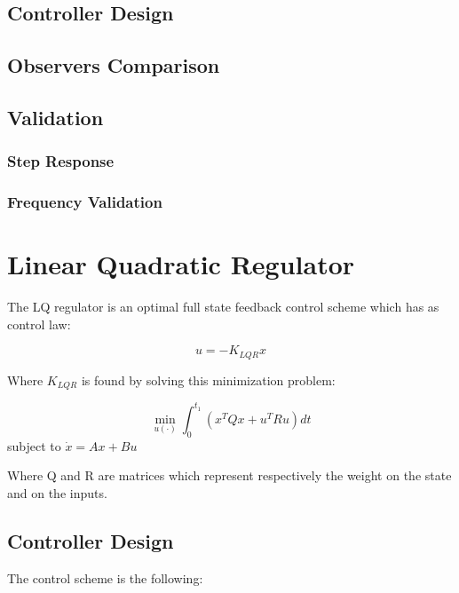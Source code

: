             \subsection{Controller Design}

            \subsection{Observers Comparison}

            \subsection{Validation}

                \subsubsection{Step Response}

                \subsubsection{Frequency Validation}


        \section{Linear Quadratic Regulator}

            The LQ regulator is an optimal full state feedback control scheme which has as control law:

            \begin{equation*}
                u = -K_{LQR}x
            \end{equation*}

            Where $K_{LQR}$ is found by solving this minimization problem:


            $$ \min _{u(\cdot)} \int_0^{t_1}\left(x^T Q x+u^T R u\right) d t $$ 
            subject to $\dot{x}=A x+B u$ 

            Where Q and R are matrices which represent respectively the weight on the state and on the inputs.

            \subsection{Controller Design}

                The control scheme is the following:

